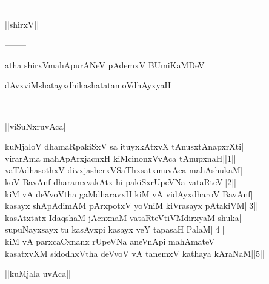 \documentclass{article}
\begin{document}
\begin{center}
---------------
\end{center}

\begin{center}
||shirxV||
\end{center}

\begin{center}
--------
\end{center}

\begin{center}
atha shirxVmahApurANeV pAdemxV BUmiKaMDeV
\end{center}

\begin{center}
dAvxviMshatayxdhikashatatamoVdhAyxyaH
\end{center}

\begin{center}
---------------
\end{center}

\begin{center}
||viSuNxruvAca||
\end{center}

kuMjaloV dhamaRpakiSxV sa ituyxkAtxvX tAnusxtAnapxrXti|\\
virarAma mahApArxjacnxH kiMcinonxVvAca tAnupxnaH||1||\\
vaTAdhasothxV divxjasherxVSaThxsatxmuvAca mahAshukaM|\\
koV BavAnf dharamxvakAtx hi pakiSxrUpeVNa vataRteV||2||\\
kiM vA deVvoVtha gaMdharavxH kiM vA vidAyxdharoV BavAnf|\\
kasayx shApAdimAM pArxpotxV yoVniM kiVrasayx pAtakiVM||3||\\
kasAtxtatx IdaqshaM jAcnxnaM vataRteVtiVMdirxyaM shuka|\\
supuNayxsayx tu kasAyxpi kasayx veY tapasaH PalaM||4||\\
kiM vA parxcaCxnanx rUpeVNa aneVnApi mahAmateV|\\
kasatxvXM sidodhxVtha deVvoV vA tanemxV kathaya kAraNaM||5||\\

\begin{center}
||kuMjala uvAca||
\end{center}
\end{document}
